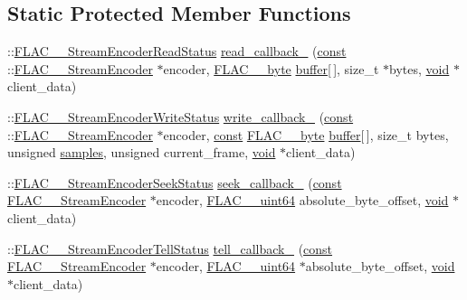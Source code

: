 \subsection*{Static Protected Member Functions}
\begin{DoxyCompactItemize}
\item 
\+::\hyperlink{group__flac__stream__encoder_ga2e81f007fb0a7414c0bbb453f37ea37f}{F\+L\+A\+C\+\_\+\+\_\+\+Stream\+Encoder\+Read\+Status} \hyperlink{class_f_l_a_c_1_1_encoder_1_1_stream_a3061b822212a78e981a56877f895038d}{read\+\_\+callback\+\_\+} (\hyperlink{getopt1_8c_a2c212835823e3c54a8ab6d95c652660e}{const} \+::\hyperlink{struct_f_l_a_c_____stream_encoder}{F\+L\+A\+C\+\_\+\+\_\+\+Stream\+Encoder} $\ast$encoder, \hyperlink{ordinals_8h_a5eb569b12d5b047cdacada4d57924ee3}{F\+L\+A\+C\+\_\+\+\_\+byte} \hyperlink{structbuffer}{buffer}\mbox{[}$\,$\mbox{]}, size\+\_\+t $\ast$bytes, \hyperlink{sound_8c_ae35f5844602719cf66324f4de2a658b3}{void} $\ast$client\+\_\+data)
\item 
\+::\hyperlink{group__flac__stream__encoder_ga3737471fd49730bb8cf9b182bdeda05e}{F\+L\+A\+C\+\_\+\+\_\+\+Stream\+Encoder\+Write\+Status} \hyperlink{class_f_l_a_c_1_1_encoder_1_1_stream_acbeed6309e1f9ef04990fc492180d1bc}{write\+\_\+callback\+\_\+} (\hyperlink{getopt1_8c_a2c212835823e3c54a8ab6d95c652660e}{const} \+::\hyperlink{struct_f_l_a_c_____stream_encoder}{F\+L\+A\+C\+\_\+\+\_\+\+Stream\+Encoder} $\ast$encoder, \hyperlink{getopt1_8c_a2c212835823e3c54a8ab6d95c652660e}{const} \hyperlink{ordinals_8h_a5eb569b12d5b047cdacada4d57924ee3}{F\+L\+A\+C\+\_\+\+\_\+byte} \hyperlink{structbuffer}{buffer}\mbox{[}$\,$\mbox{]}, size\+\_\+t bytes, unsigned \hyperlink{test__w__saw8_8c_a54185623a5a093f671a73e5fba6197a1}{samples}, unsigned current\+\_\+frame, \hyperlink{sound_8c_ae35f5844602719cf66324f4de2a658b3}{void} $\ast$client\+\_\+data)
\item 
\+::\hyperlink{group__flac__stream__encoder_ga6d5be3489f45fcf0c252022c65d87aca}{F\+L\+A\+C\+\_\+\+\_\+\+Stream\+Encoder\+Seek\+Status} \hyperlink{class_f_l_a_c_1_1_encoder_1_1_stream_a7c243c5ee0a7de32bbf390daa10d8a43}{seek\+\_\+callback\+\_\+} (\hyperlink{getopt1_8c_a2c212835823e3c54a8ab6d95c652660e}{const} \hyperlink{struct_f_l_a_c_____stream_encoder}{F\+L\+A\+C\+\_\+\+\_\+\+Stream\+Encoder} $\ast$encoder, \hyperlink{ordinals_8h_aa78c8c70a3eb8a58af7436f278acde8e}{F\+L\+A\+C\+\_\+\+\_\+uint64} absolute\+\_\+byte\+\_\+offset, \hyperlink{sound_8c_ae35f5844602719cf66324f4de2a658b3}{void} $\ast$client\+\_\+data)
\item 
\+::\hyperlink{group__flac__stream__encoder_gab628f63181250eb977a28bf12b7dd9ff}{F\+L\+A\+C\+\_\+\+\_\+\+Stream\+Encoder\+Tell\+Status} \hyperlink{class_f_l_a_c_1_1_encoder_1_1_stream_ae939dd38bd45f140d35de673bee50be6}{tell\+\_\+callback\+\_\+} (\hyperlink{getopt1_8c_a2c212835823e3c54a8ab6d95c652660e}{const} \hyperlink{struct_f_l_a_c_____stream_encoder}{F\+L\+A\+C\+\_\+\+\_\+\+Stream\+Encoder} $\ast$encoder, \hyperlink{ordinals_8h_aa78c8c70a3eb8a58af7436f278acde8e}{F\+L\+A\+C\+\_\+\+\_\+uint64} $\ast$absolute\+\_\+byte\+\_\+offset, \hyperlink{sound_8c_ae35f5844602719cf66324f4de2a658b3}{void} $\ast$client\+\_\+data)

\end{DoxyCompactItemize}
